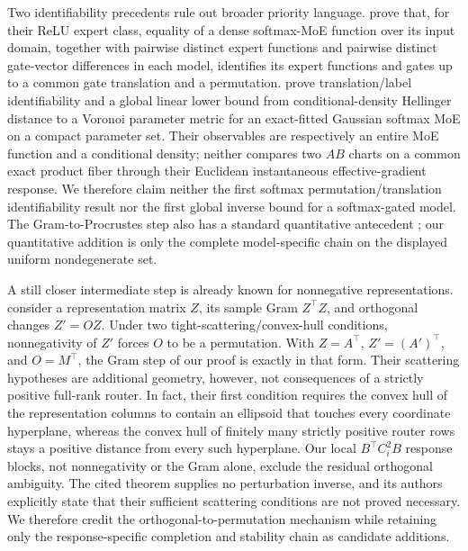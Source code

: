 Two identifiability precedents rule out broader priority language.
\citet[Thm.~4.1]{tran2025linear} prove that, for their ReLU expert class,
equality of a dense softmax-MoE function over its input domain, together with
pairwise distinct expert functions and pairwise distinct gate-vector
differences in each model, identifies its expert functions and gates up to a common gate translation
and a permutation.  \citet[Prop.~1 and Thm.~1]{nguyen2023demystifying} prove
translation/label identifiability and a global linear lower bound from
conditional-density Hellinger distance to a Voronoi parameter metric for an
exact-fitted Gaussian softmax MoE on a compact parameter set.  Their
observables are respectively an entire MoE function and a conditional
density; neither compares two $AB$ charts on a common exact product fiber
through their Euclidean instantaneous effective-gradient response.  We
therefore claim neither the first softmax permutation/translation
identifiability result nor the first global inverse bound for a softmax-gated
model.  The Gram-to-Procrustes step also has a standard quantitative
antecedent \citep[Lem.~5.4]{tu2016lowrank}; our quantitative addition is only
the complete model-specific chain on the displayed uniform nondegenerate set.

A still closer intermediate step is already known for nonnegative
representations.  \citet[Theorem~2 and Appendix~D.2]{dorrell2026convex}
consider a representation matrix \(Z\), its sample Gram \(Z^\top Z\), and
orthogonal changes \(Z'=OZ\).  Under two tight-scattering/convex-hull
conditions, nonnegativity of \(Z'\) forces \(O\) to be a permutation.  With
\(Z=A^\top\), \(Z'=(A')^\top\), and \(O=M^\top\), the Gram step of our proof is
exactly in that form.  Their scattering hypotheses are additional geometry,
however, not consequences of a strictly positive full-rank router.  In fact,
their first condition requires the convex hull of the representation columns
to contain an ellipsoid that touches every coordinate hyperplane, whereas the
convex hull of finitely many strictly positive router rows stays a positive
distance from every such hyperplane.  Our local \(B^\top C_i^2B\) response
blocks, not nonnegativity or the Gram alone, exclude the residual orthogonal
ambiguity.  The cited theorem supplies no perturbation inverse, and its
authors explicitly state that their sufficient scattering conditions are not
proved necessary.  We therefore credit the orthogonal-to-permutation
mechanism while retaining only the response-specific completion and stability
chain as candidate additions.

